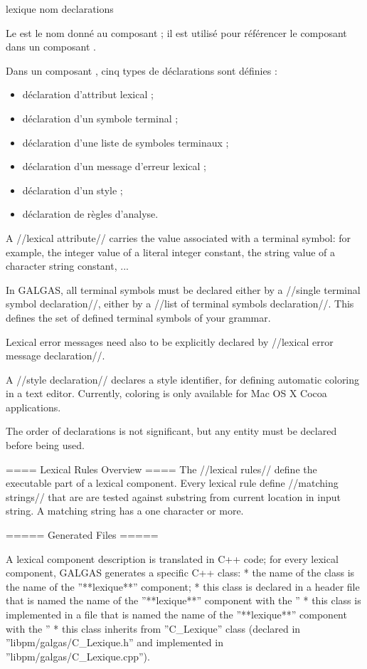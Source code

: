 {
\begin{galgascode}
lexique nom {
  declarations
}
\end{galgascode}

Le  est le nom donné au composant ; il est utilisé pour référencer le composant  dans un composant .


Dans un composant , cinq types de déclarations sont définies :
\begin{itemize}
  \item déclaration d'attribut lexical ;
  \item déclaration d'un symbole terminal ;
  \item déclaration d'une liste de symboles terminaux ;
  \item déclaration d'un message d'erreur lexical ;
  \item déclaration d'un style ;
  \item déclaration de règles d'analyse.
\end{itemize}

A //lexical attribute// carries the value associated with a terminal symbol: for example, the integer value of a literal integer constant, the string value of a character string constant, ...

In GALGAS, all terminal symbols must be declared either by a //single terminal symbol declaration//, either by a //list of terminal symbols declaration//. This defines the set of defined terminal symbols of your grammar.

Lexical error messages need also to be explicitly declared by //lexical error message declaration//. 

A //style declaration// declares a style identifier, for defining automatic coloring in a text editor. Currently, coloring is only available for Mac OS X Cocoa applications.

The order of declarations is not significant, but any entity must be declared before being used.

==== Lexical Rules Overview ====
The //lexical rules// define the executable part of a lexical component. Every lexical rule define //matching strings// that are are tested against substring from current location in input string. A matching string has a one character or more.

===== Generated Files =====

A lexical component description is translated in C++ code; for every lexical component, GALGAS generates a specific C++ class:
  * the name of the class is the name of the ''**lexique**'' component;
  * this class is declared in a header file that is named the name of the ''**lexique**'' component with the ''%
  * this class is implemented in a file that is named the name of the ''**lexique**'' component with the ''%
  * this class inherits from ''C\_Lexique'' class (declared in ''libpm/galgas/C\_Lexique.h'' and implemented in ''libpm/galgas/C\_Lexique.cpp'').

}
